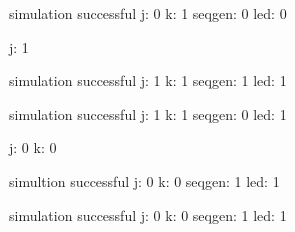 \begin{itemize}
simulation successful\newline
j: 0\newline
k: 1\newline
seqgen: 0\newline
led: 0\newline

j: 1\newline

simulation successful\newline
j: 1\newline
k: 1\newline
seqgen: 1\newline
led: 1\newline

simulation successful\newline
j: 1\newline
k: 1\newline
seqgen: 0\newline
led: 1\newline

j: 0\newline
k: 0\newline

simultion successful\newline
j: 0\newline
k: 0\newline
seqgen: 1\newline
led: 1\newline

simulation successful\newline
j: 0\newline
k: 0\newline
seqgen: 1\newline
led: 1\newline

\end{itemize}





